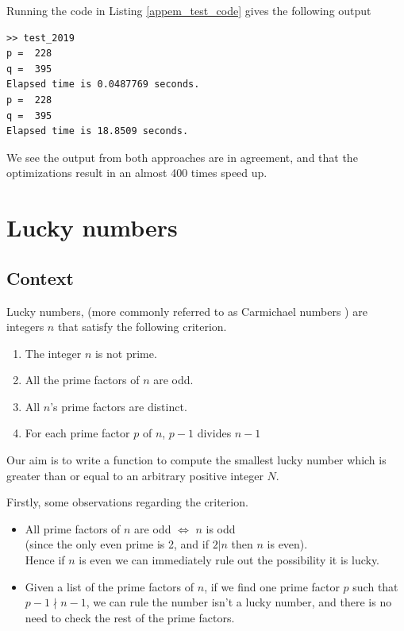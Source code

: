 \documentclass[10pt]{article}
\begin{document}
Running the code in Listing \ref{appem_test_code} gives the following output

\begin{verbatim}
>> test_2019
p =  228
q =  395
Elapsed time is 0.0487769 seconds.
p =  228
q =  395
Elapsed time is 18.8509 seconds.
\end{verbatim}

We see the output from both approaches are in agreement, and that the optimizations result in an almost 400 times speed up.

\section{Lucky numbers}

\subsection{Context}
Lucky numbers, (more commonly referred to as Carmichael numbers \cite{carmichael}) are integers $n$ that satisfy the following criterion.

\begin{enumerate}
\item The integer $n$ is not prime.
\item All the prime factors of $n$ are odd.
\item All $n$'s prime factors are distinct.
\item For each prime factor $p$ of $n$, $p - 1$ divides $n-1$ 
\end{enumerate}

Our aim is to write a function to compute the smallest lucky number which is greater than or equal to an arbitrary positive integer $N$. 

Firstly, some observations regarding the criterion.

\begin{itemize}

\item All prime factors of $n$ are odd $\iff$ $n$ is odd\\
 (since the only even prime is 2, and if $2|n$ then $n$ is even).\\
 
 Hence if $n$ is even we can immediately rule out the possibility it is lucky.
\item Given a list of the prime factors of $n$, if we find one prime factor $p$ such that $p -1 \nmid n-1$, we can rule the number isn't a lucky number, and there is no need to check the rest of the prime factors.
\end{itemize}
\end{document}
